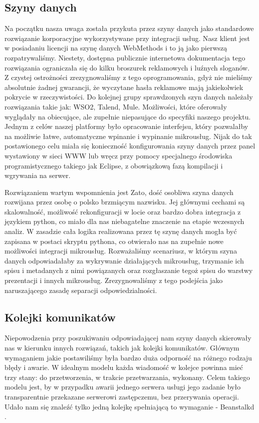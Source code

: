 \documentclass[licencjacka]{pracamgr}
\begin{document}
\subsection{Szyny danych}

Na początku nasza uwaga została przykuta przez szyny danych jako standardowe rozwiązanie korporacyjne wykorzystywane
przy integracji usług. Nasz klient jest w posiadaniu licencji na szynę danych WebMethods i to ją jako pierwszą
rozpatrywaliśmy. Niestety, dostępna publicznie internetowa dokumentacja tego rozwiązania ograniczała się do kilku
broszurek reklamowych i luźnych sloganów. Z czystej ostrożności zrezygnowaliśmy z tego oprogramowania, gdyż nie
mieliśmy absolutnie żadnej gwarancji, że wyczytane hasła reklamowe mają jakiekolwiek pokrycie w rzeczywistości.
Do kolejnej grupy sprawdzonych szyn danych należały rozwiązania takie jak: WSO2, Talend, Mule. Możliwości, które
oferowały wyglądały na obiecujące, ale zupełnie niepasujące do specyfiki naszego projektu. Jednym z celów naszej
platformy było opracowanie interfejsu, który pozwalałby na możliwie łatwe, automatyczne wpinanie i wypinanie
mikrousług. Nijak do tak postawionego celu miała się konieczność konfigurowania szyny danych przez panel wystawiony w sieci
WWW lub wręcz przy pomocy specjalnego środowiska programistycznego takiego jak Eclipse, z obowiązkową fazą kompilacji
i wgrywania na serwer. 

Rozwiązaniem wartym wspomnienia jest Zato, dość osobliwa szyna danych rozwijana przez osobę o polsko brzmiącym nazwisku. Jej głównymi cechami są skalowalność, możliwość rekonfiguracji w locie oraz bardzo dobra integracja z językiem python, co miało dla nas niebagatelne znaczenie na etapie wczesnych analiz. W zasadzie cała logika realizowana przez tę szynę danych mogła być zapisana w postaci skryptu pythona, co otwierało nas na zupełnie nowe możliwości integracji mikrousług. Rozważaliśmy scenariusz, w którym szyna danych odpowiadałaby za wykrywanie działających mikrousług, trzymanie ich spisu i metadanych z nimi powiązanych oraz rozgłaszanie tegoż spisu do warstwy prezentacji i innych mikrousług. Zrezygnowaliśmy z tego podejścia jako naruszającego zasadę separacji odpowiedzialności.

\subsection{Kolejki komunikatów}
Niepowodzenia przy poszukiwaniu odpowiadającej nam szyny danych skierowały nas w kierunku innych rozwiązań, takich jak
kolejki komunikatów. Głównym wymaganiem jakie postawiliśmy była bardzo duża odporność na różnego rodzaju błędy i
awarie. W idealnym modelu każda wiadomość w kolejce powinna mieć trzy stany: do przetworzenia, w trakcie przetwarzania, wykonany. Celem takiego modelu jest, by w przypadku awarii jednego serwera usługi jego zadanie było transparentnie przekazane serwerowi zastępczemu, bez przerywania operacji. Udało nam się znaleźć tylko jedną kolejkę spełniającą to wymaganie - Beanstalkd \cite{beanstalkd}.
\end{document}
